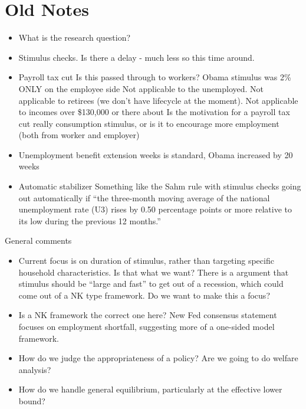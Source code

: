 \documentclass[]{article}
\begin{document}
\section{Old Notes}
\begin{itemize}
	\item What is the research question?
	\item Stimulus checks. Is there a delay - much less so this time around.
	\item Payroll tax cut
	\subitem Is this passed through to workers? Obama stimulus was 2\% ONLY on the employee side
	\subitem Not applicable to the unemployed. 
	\subitem Not applicable to retirees (we don't have lifecycle at the moment).
	\subitem Not applicable to incomes over \$130,000 or there about
	\subitem Is the motivation for a payroll tax cut really consumption stimulus, or is it to encourage more employment (both from worker and employer)
	\item Unemployment benefit extension
	 weeks is standard, Obama increased by 20 weeks
	\item Automatic stabilizer
	\subitem Something like the Sahm rule with stimulus checks going out automatically if ``the three-month moving average of the national unemployment rate (U3) rises by 0.50 percentage points or more relative to its low during the previous 12 months.''
\end{itemize}

General comments
\begin{itemize}
	\item Current focus is on duration of stimulus, rather than targeting specific household characteristics. Is that what we want? There is a argument that stimulus should be ``large and fast'' to get out of a recession, which could come out of a NK type framework. Do we want to make this a focus?
	\item Is a NK framework the correct one here? New Fed consensus statement focuses on employment shortfall, suggesting more of a one-sided model framework.
	\item How do we judge the appropriateness of a policy? Are we going to do welfare analysis?
	\item How do we handle general equilibrium, particularly at the effective lower bound?
\end{itemize}
\end{document}

